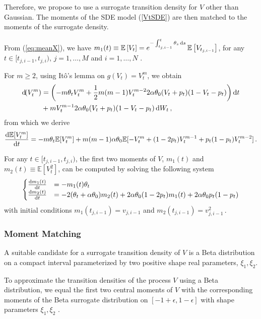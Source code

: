 \documentclass[11pt]{article}
\theoremstyle{definition}
\begin{document}
Therefore, we propose to use a surrogate transition density for $V$ other than Gaussian. The moments of the SDE model (\ref{VtSDE}) are then matched to the moments of the surrogate density. 

From (\ref{eq:meanX}), we have $m_1(t) \equiv \mathbb{E} \left[V_t\right] = e^{- \int_{t_{j,i-1}}^t \theta_s \dif s} \,\mathbb{E} \left[V_{t_{j,i-1}}\right]$, for any $t\in [t_{j,i-1}, t_{j, i})$, $j = 1, \ldots, M$ and $i = 1, \ldots, N$ .

For $m \geq 2$, using It\^o's lemma on $g(V_t) = V_t^m$, we obtain
\begin{align}
\dif (V_t^m) & = \left( - m \theta_t V_t^m + \frac{1}{2} m (m -1) V_t^{m -2} 2 \alpha \theta_0 (V_t + p_t) (1 - V_t - p_t) \right) \dif t  \nonumber \\
& + m V_t^{m-1} 2 \alpha \theta_0 (V_t + p_t) (1 - V_t - p_t) \dif W_t \,, \nonumber
\end{align}
from which we derive
\begin{equation}
\frac{\dif  \mathbb{E}[ V^m_t]}{\dif t} = - m \theta_t \mathbb{E}[ V^m_t] + m (m-1) \alpha \theta_0  \mathbb{E}[ - V_t^m + (1 - 2 p_t) V_t^{m-1} + p_t (1 -p_t) V_t^{m-2} ] \,.
\end{equation}

For any $t\in [t_{j,i-1}, t_{j, i})$, the first two moments of $V$, $m_1(t)$ and $m_2(t) \equiv \mathbb{E}[V_t^2]$, can be computed by solving the following system
\begin{equation}
\begin{cases}
\frac{\dif  m_1 (t)}{\dif t} &=  - m_1(t)\theta_t   \\
\frac{\dif  m_2 (t)}{\dif t} &=  -2 (\theta_t +\alpha \theta_0) m_2(t) + 2 \alpha\theta_0 (1-2p_t)  m_1(t) + 2 \alpha\theta_0 p_t (1-p_t) 
\end{cases}
\label{Vtmom}
\end{equation}
with initial conditions $m_1(t_{j,i-1})= v_{j, i-1}$ and $m_2(t_{j,i-1})= v_{j, i-1}^2 \,.$


\subsubsection{Moment Matching}
A suitable candidate for a surrogate transition density of $V$ is a Beta distribution on a compact interval parameterized by two positive shape real parameters, $\xi_1, \xi_2$. 

To approximate the transition densities of  the process $V$ using a Beta distribution, we equal the first two central moments of $V$ with the corresponding moments of the Beta surrogate distribution on $[-1 + \epsilon,1 - \epsilon]$ with shape parameters $\xi_1, \xi_2$ . 
\end{document}
